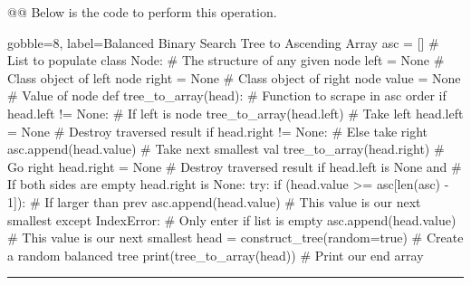 \documentclass[10pt]{article}
\begin{document}
\begin{easylist}[enumerate]
    @@ Below is the code to perform this operation.

    \vspace{5pt}\begin{pythoncode*}{gobble=8, label=Balanced Binary Search Tree to Ascending Array}
        asc = []                               # List to populate
        class Node:                            # The structure of any given node
            left = None                        # Class object of left node
            right = None                       # Class object of right node
            value = None                       # Value of node
        def tree_to_array(head):               # Function to scrape in asc order
            if head.left != None:              # If left is node
                tree_to_array(head.left)       # Take left
                head.left = None               # Destroy traversed result
            if head.right != None:             # Else take right
                asc.append(head.value)         # Take next smallest val
                tree_to_array(head.right)      # Go right
                head.right = None              # Destroy traversed result
            if head.left is None and           # If both sides are empty
                    head.right is None:
                try:
                    if (head.value >=
                        asc[len(asc) - 1]):    # If larger than prev
                        asc.append(head.value) # This value is our next smallest
                except IndexError:             # Only enter if list is empty
                    asc.append(head.value)     # This value is our next smallest
        head = construct_tree(random=true)     # Create a random balanced tree
        print(tree_to_array(head))             # Print our end array
    \end{pythoncode*}

    \rule{3in}{0.5pt}


\end{easylist}
\end{document}
